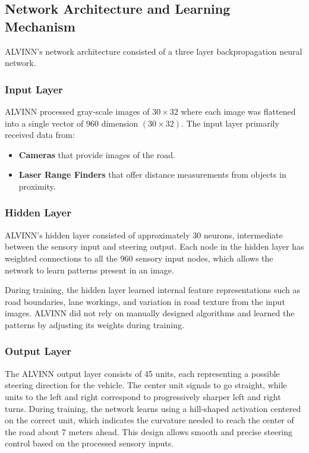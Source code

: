 \documentclass[11pt,a4paper]{report}
\begin{document}
\subsection{Network Architecture and Learning Mechanism}
ALVINN's network architecture consisted of a three layer backpropagation neural network.

\subsubsection{Input Layer}
ALVINN processed gray-scale images of $ 30\times32$ where each image was flattened into a single vector of 960 dimension $(30 \times 32)$.
The input layer primarily received data from:
\begin{itemize}
\item \textbf{Cameras} that provide images of the road.
\item \textbf{Laser Range Finders} that offer distance measurements from objects in proximity.
\end{itemize}

\subsubsection{Hidden Layer}
ALVINN's hidden layer consisted of approximately 30 neurons, intermediate between the sensory input and steering output. Each node in the hidden layer has weighted connections to all the 960 sensory input nodes, which allows the network to learn patterns present in an image.

During training, the hidden layer learned internal feature representations such as road boundaries, lane workings, and variation in road texture from the input images. ALVINN did not rely on manually designed algorithms and learned the patterns by adjusting its weights during training.

\subsubsection{Output Layer}
The ALVINN output layer consists of 45 units, each representing a possible steering direction for the vehicle. The center unit signals to go straight, while units to the left and right correspond to progressively sharper left and right turns. During training, the network learns using a hill-shaped activation centered on the correct unit, which indicates the curvature needed to reach the center of the road about 7 meters ahead. This design allows smooth and precise steering control based on the processed sensory inputs.
\end{document}
